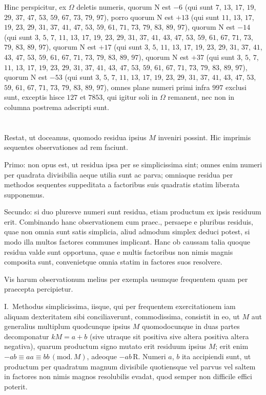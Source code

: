 \documentclass[12pt,a4paper]{article}
\theoremstyle{plain}
\theoremstyle{definition}
\theoremstyle{remark}
\newcommand{\RM}{\mathrm{R}}
\newcommand{\NR}{\mathrm{N}}
\begin{document}
Hinc perspicitur, ex $\Omega$ deletis numeris, quorum $\NR$ est $-6$ (qui sunt $7$, $13$, $17$, $19$, $29$, $37$, $47$, $53$, $59$, $67$, $73$, $79$, $97$), porro quorum $\NR$ est $+13$ (qui sunt $11$, $13$, $17$, $19$, $23$, $29$, $31$, $37$, $41$, $47$, $53$, $59$, $61$, $71$, $73$, $79$, $83$, $89$, $97$), quorum $\NR$ est $-14$ (qui sunt $3$, $5$, $7$, $11$, $13$, $17$, $19$, $23$, $29$, $31$, $37$, $41$, $43$, $47$, $53$, $59$, $61$, $67$, $71$, $73$, $79$, $83$, $89$, $97$), quorum $\NR$ est $+17$ (qui sunt $3$, $5$, $11$, $13$, $17$, $19$, $23$, $29$, $31$, $37$, $41$, $43$, $47$, $53$, $59$, $61$, $67$, $71$, $73$, $79$, $83$, $89$, $97$), quorum $\NR$ est $+37$ (qui sunt $3$, $5$, $7$, $11$, $13$, $17$, $19$, $23$, $29$, $31$, $37$, $41$, $43$, $47$, $53$, $59$, $61$, $67$, $71$, $73$, $79$, $83$, $89$, $97$), quorum $\NR$ est $-53$ (qui sunt $3$, $5$, $7$, $11$, $13$, $17$, $19$, $23$, $29$, $31$, $37$, $41$, $43$, $47$, $53$, $59$, $61$, $67$, $71$, $73$, $79$, $83$, $89$, $97$), omnes plane numeri primi infra $997$ exclusi sunt, exceptis hisce $127$ et $7853$, qui igitur soli in $\Omega$ remanent, nec non in columna postrema adscripti sunt.

\section{}

Restat, ut doceamus, quomodo residua ipsius $M$ inveniri possint. Hic imprimis sequentes observationes ad rem faciunt.

Primo: non opus est, ut residua ipsa per se simplicissima sint; omnes enim numeri per quadrata divisibilia aeque utilia sunt ac parva; omniaque residua per methodos sequentes suppeditata a factoribus suis quadratis statim liberata supponemus.

Secundo: si duo pluresve numeri sunt residua, etiam productum ex ipsis residuum erit. Combinando hanc observationem cum praec., persaepe e pluribus residuis, quae non omnia sunt satis simplicia, aliud admodum simplex deduci potest, si modo illa multos factores communes implicant. Hanc ob caussam talia quoque residua valde sunt opportuna, quae e multis factoribus non nimis magnis composita sunt, convenietque omnia statim in factores suos resolvere.

Vis harum observationum melius per exempla usumque frequentem quam per praecepta percipietur.

\textsc{I.}\ Methodus simplicissima, iisque, qui per frequentem exercitationem iam aliquam dexteritatem sibi conciliaverunt, commodissima, consistit in eo, ut $M$ aut generalius multiplum quodcunque ipsius $M$ quomodocunque in duas partes decomponatur $kM=a+b$ (sive utraque sit positiva sive altera positiva altera negativa), quarum productum signo mutato erit residuum ipsius $M$; erit enim $-ab\equiv aa\equiv bb\,(\mathrm{mod.}\,M)$, adeoque $-ab\,\RM$. Numeri $a$, $b$ ita accipiendi sunt, ut productum per quadratum magnum divisibile quotiensque vel parvus vel saltem in factores non nimis magnos resolubilis evadat, quod semper non difficile effici poterit.
\end{document}
